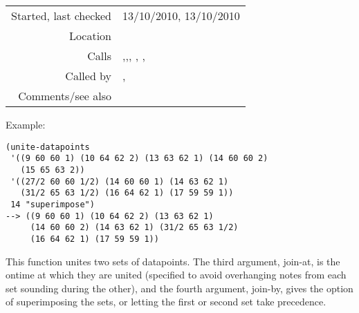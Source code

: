 \vspace{0.3cm}
\begin{tabular}{r|p{8cm}}
Started, last checked & 13/10/2010, 13/10/2010 \\
Location & \nameref{sec:generating-beat-MNN-spacing-for-and-back} \\
Calls & \nameref{fun:remove-coincident-datapoints},\newline \nameref{fun:remove-datapoints-with-nth-item<},\newline \nameref{fun:remove-datapoints-with-nth-item<=}, \nameref{fun:remove-datapoints-with-nth-item>=}, \nameref{fun:remove-datapoints-with-nth-item>},\newline \nameref{fun:sort-dataset-asc} \\
Called by & \nameref{fun:generate-beat-MNN-spacing<->},\newline \nameref{fun:generate-beat-spacing-forced<->} \\
Comments/see also &
\end{tabular}

\vspace{0.5cm}
\noindent Example:
\begin{verbatim}
(unite-datapoints
 '((9 60 60 1) (10 64 62 2) (13 63 62 1) (14 60 60 2)
   (15 65 63 2))
 '((27/2 60 60 1/2) (14 60 60 1) (14 63 62 1)
   (31/2 65 63 1/2) (16 64 62 1) (17 59 59 1))
 14 "superimpose")
--> ((9 60 60 1) (10 64 62 2) (13 63 62 1)
     (14 60 60 2) (14 63 62 1) (31/2 65 63 1/2)
     (16 64 62 1) (17 59 59 1))
\end{verbatim}

This function unites two sets of datapoints. The third
argument, join-at, is the ontime at which they are
united (specified to avoid overhanging notes from
each set sounding during the other), and the fourth
argument, join-by, gives the option of superimposing
the sets, or letting the first or second set take
precedence.









